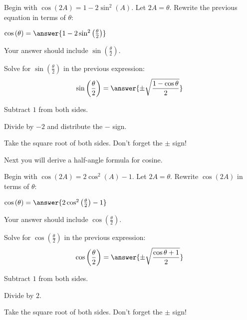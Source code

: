\documentclass[numbers]{ximera}
\begin{document}
\begin{problem}
Begin with $\cos\left(2A\right) = 1 - 2 \sin^2\left(A\right)$. Let $2A = \theta$. 
Rewrite the previous equation in terms of $\theta$:

$\cos\left(\theta\right) = \answer{1-2\sin^2\left(\frac{\theta}{2}\right)}$
\begin{hint}
Your answer should include $\sin\left(\frac{\theta}{2}\right)$.
\end{hint}
\end{problem}

\begin{question}
Solve for $\sin\left(\frac{\theta}{2}\right)$ in the previous expression:
\[\sin\left(\frac{\theta}{2}\right)=\answer{\pm\sqrt{\frac{1-\cos\theta}{2}}}\]
\begin{hint} Subtract $1$ from both sides. \end{hint}
\begin{hint} Divide by $-2$ and distribute the $-$ sign. \end{hint}
\begin{hint} Take the square root of both sides. Don't forget the $\pm$ sign! \end{hint}
\end{question}

Next you will derive a half-angle formula for cosine.

\begin{problem}
Begin with $\cos\left(2A\right) = 2 \cos^2\left(A\right) - 1$. Let $2A = \theta$.
Rewrite $\cos\left(2A\right)$ in terms of $\theta$:

$\cos\left(\theta\right)=\answer{2\cos^2\left(\frac{\theta}{2}\right)-1}$
\begin{hint}
Your answer should include $\cos\left(\frac{\theta}{2}\right)$.
\end{hint}
\end{problem}

\begin{question}
Solve for $\cos\left(\frac{\theta}{2}\right)$ in the previous expression:
\[\cos\left(\frac{\theta}{2}\right)=\answer{\pm \sqrt{\frac{\cos\theta+1}{2}}}\]
\begin{hint} Subtract $1$ from both sides. \end{hint}
\begin{hint} Divide by $2$. \end{hint}
\begin{hint} Take the square root of both sides. Don't forget the $\pm$ sign! \end{hint}
\end{question}
\end{document}
